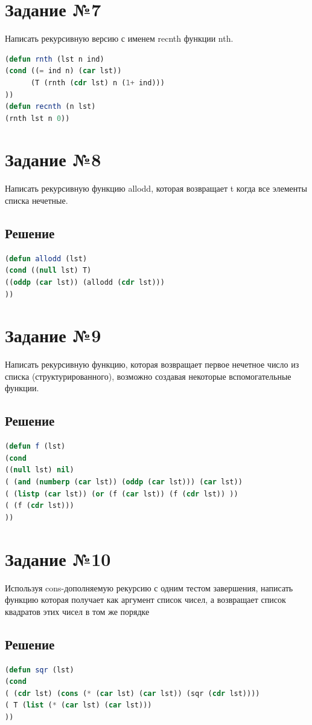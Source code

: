 \documentclass[12pt]{report}
\begin{document}
\section*{Задание №7}
Написать рекурсивную версию с именем recnth функции nth.
\begin{lstlisting}[label=5,caption=Решение задания №7, language=lisp]
(defun rnth (lst n ind)
(cond ((= ind n) (car lst))
      (T (rnth (cdr lst) n (1+ ind)))
))
(defun recnth (n lst)
(rnth lst n 0))

\end{lstlisting}

\section*{Задание №8}
Написать рекурсивную функцию allodd, которая возвращает t когда все элементы списка нечетные.
\subsection*{Решение}
\begin{lstlisting}[label=5,caption=Решение задания №8, language=lisp]
(defun allodd (lst)
(cond ((null lst) T)
((oddp (car lst)) (allodd (cdr lst)))
))
\end{lstlisting}	

\section*{Задание №9}
Написать рекурсивную функцию, которая возвращает первое нечетное число из списка
(структурированного), возможно создавая некоторые вспомогательные функции.
\subsection*{Решение}
\begin{lstlisting}[label=5,caption=Решение задания №9, language=lisp]
(defun f (lst)
(cond 
((null lst) nil)
( (and (numberp (car lst)) (oddp (car lst))) (car lst))
( (listp (car lst)) (or (f (car lst)) (f (cdr lst)) ))
( (f (cdr lst)))
))
\end{lstlisting}	

\section*{Задание №10}
Используя cons-дополняемую рекурсию с одним тестом завершения,
написать функцию которая получает как аргумент список чисел, а возвращает список
квадратов этих чисел в том же порядке
\subsection*{Решение}
\begin{lstlisting}[label=5,caption=Решение задания №10, language=lisp]
(defun sqr (lst)
(cond 
( (cdr lst) (cons (* (car lst) (car lst)) (sqr (cdr lst))))
( T (list (* (car lst) (car lst)))
))
\end{lstlisting}	
	
\end{document}
